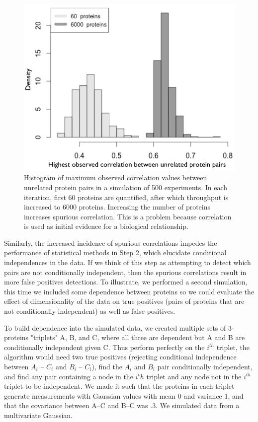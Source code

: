\documentclass[journal=jacsat,manuscript=article]{achemso}
\def\added#1{{\color{blue} #1}}
\begin{document}
\begin{figure}[!tpb]
\centerline{\includegraphics[width=.8\textwidth]{figs/spurious_corr.png}}
\caption{Histogram of maximum observed correlation values between unrelated protein pairs in a simulation of 500 experiments.  In each iteration,  first 60 proteins are quantified, after which throughput is increased to 6000 proteins.  Increasing the number of proteins increases spurious correlation.  This is a problem because correlation is used as initial evidence for a biological relationship.}
\label{spur_corr}
\end{figure}

Similarly, the increased incidence of spurious correlations impedes the performance of statistical methods in Step 2, which elucidate conditional independences in the data.  If we think of this step as \added{attempting to detect which pairs are not conditionally independent}, then the spurious correlations result in more false positives \added{detections}. To illustrate, \added{we performed a second simulation}, this time we included some dependence between proteins so we could evaluate the effect of dimensionality of the data on true positives (pairs of proteins that are not conditionally independent) as well as false positives.  

\added{To build dependence into the simulated data, we created multiple sets of 3-proteins "triplets" A, B, and C, where all three are dependent but A and B are conditionally independent given C.  Thus perform perfectly on the $i^{th}$ triplet, the algorithm would need two true positives (rejecting conditional independence between $A_i$ -- $C_i$ and $B_i$ -- $C_i$), find the $A_i$ and $B_i$ pair conditionally independent, and find any pair containing a node in the $i^th$ triplet and any node not in the $i^{th}$ triplet to be independent.  We made it such that the proteins in each triplet generate measurements with Gaussian values with mean 0 and variance 1, and that the covariance between A--C and B--C was .3.  We simulated data from a multivariate Gaussian. }
\end{document}
